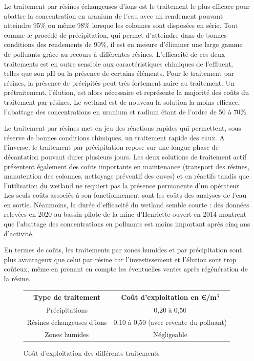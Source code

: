 \documentclass{article}
\begin{document}
Le traitement par résines échangeuses d’ions est le traitement le plus efficace pour abattre la concentration en uranium de l’eau avec un rendement pouvant atteindre 95\% ou même 98\% lorsque les colonnes sont disposées en série.  Tout comme le procédé de précipitation, qui permet d’atteindre dans de bonnes conditions des rendements de 90\%, il est en mesure d’éliminer une large gamme de polluants grâce au recours à différentes résines. L’efficacité de ces deux traitements est en outre sensible aux caractéristiques chimiques de l’effluent, telles que son pH ou la présence de certains éléments. Pour le traitement par résines, la présence de précipités peut très fortement nuire au traitement. Un prétraitement, l’élution, est alors nécessaire et représente la majorité des coûts du traitement par résines. Le wetland est de nouveau la solution la moins efficace, l’abattage des concentrations en uranium et radium étant de l’ordre de 50 à 70\%.

Le traitement par résines met en jeu des réactions rapides qui permettent, sous réserve de bonnes conditions chimiques, un traitement rapide des eaux. A l’inverse, le traitement par précipitation repose sur une longue phase de décantation pouvant durer plusieurs jours. Les deux solutions de traitement actif présentent également des coûts importants en maintenance (transport des résines, manutention des colonnes, nettoyage préventif des cuves) et en réactifs tandis que l’utilisation du wetland ne requiert pas la présence permanente d’un opérateur. Les seuls coûts associés à son fonctionnement sont les coûts des analyses de l’eau en sortie.  Néanmoins, la durée d’efficacité du wetland semble courte : des données relevées en 2020 au bassin pilote de la mine d’Henriette ouvert en 2014 montrent que l’abattage des concentrations en polluants est moins important après cinq ans d’activité. 

En termes de coûts, les traitements par zones humides et par précipitation sont plus avantageux que celui par résine car l’investissement et l’élution sont trop coûteux, même en prenant en compte les éventuelles ventes après régénération de la résine.


\begin{figure}[H]
    \centering    
    \begin{tabular}{ |c |c |}
        \hline
         \textbf{Type de traitement} & \textbf{Coût d’exploitation en €/m$^3$} \\ 
         \hline
         Précipitations & 0,20 à 0,50 \\ 
         \hline
         Résines échangeuses d’ions & 0,10 à 0,50 (avec revente du polluant)  \\
         \hline
        Zones humides & Négligeable  \\
         \hline
    \end{tabular}
    \caption{Coût d'exploitation des différents traitements \cite{schick_les_2020}}
\label{tab:cout_exploitation_traitements}
\end{figure}
\end{document}
